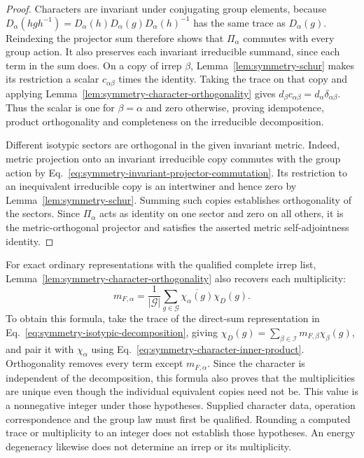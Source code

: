 \begin{proof}
Characters are invariant under conjugating group elements, because
$D_\alpha(hgh^{-1})=D_\alpha(h)D_\alpha(g)D_\alpha(h)^{-1}$ has the
same trace as $D_\alpha(g)$. Reindexing the projector sum therefore shows
that $\Pi_\alpha$ commutes with every group action. It also preserves each
invariant irreducible summand, since each term in the sum does.
On a copy of irrep $\beta$, Lemma~\ref{lem:symmetry-schur} makes its
restriction a scalar $c_{\alpha\beta}$ times the identity. Taking the trace
on that copy and applying Lemma~\ref{lem:symmetry-character-orthogonality}
gives $d_\beta c_{\alpha\beta}=d_\alpha\delta_{\alpha\beta}$.
Thus the scalar is one for $\beta=\alpha$ and zero otherwise, proving
idempotence, product orthogonality and completeness on the irreducible
decomposition.

Different isotypic sectors are orthogonal in the given invariant metric.
Indeed, metric projection onto an invariant irreducible copy commutes with
the group action by Eq.~\eqref{eq:symmetry-invariant-projector-commutation}.
Its restriction to an inequivalent irreducible copy is an intertwiner and
hence zero by Lemma~\ref{lem:symmetry-schur}. Summing such copies establishes
orthogonality of the sectors. Since $\Pi_\alpha$ acts as identity on one
sector and zero on all others, it is the metric-orthogonal projector and
satisfies the asserted metric self-adjointness identity.
\end{proof}

For exact ordinary representations with the qualified complete irrep list,
Lemma~\ref{lem:symmetry-character-orthogonality} also recovers each multiplicity:
\begin{equation}
  m_{F,\alpha}=\frac{1}{|\mathcal G|}
    \sum_{g\in\mathcal G}\overline{\chi_\alpha(g)}\chi_D(g).
  \label{eq:symmetry-character-multiplicity}
\end{equation}
To obtain this formula, take the trace of the direct-sum representation in
Eq.~\eqref{eq:symmetry-isotypic-decomposition}, giving
$\chi_D(g)=\sum_{\beta\in\mathcal I}m_{F,\beta}\chi_\beta(g)$, and pair
it with $\chi_\alpha$ using Eq.~\eqref{eq:symmetry-character-inner-product}.
Orthogonality removes every term except $m_{F,\alpha}$. Since the character
is independent of the decomposition, this formula also proves that the
multiplicities are unique even though the individual equivalent copies need
not be. This value is a nonnegative integer under those hypotheses. Supplied character
data, operation correspondence and the group law must first be qualified.
Rounding a computed trace or multiplicity to an integer does not establish
those hypotheses. An energy degeneracy likewise does not determine an irrep
or its multiplicity.

